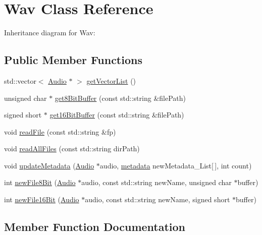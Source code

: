 \hypertarget{classWav}{}\section{Wav Class Reference}
\label{classWav}


Inheritance diagram for Wav\+:
\subsection*{Public Member Functions}
\begin{DoxyCompactItemize}
\item 
std\+::vector$<$ \hyperlink{classAudio}{Audio} $\ast$ $>$ \hyperlink{classWav_a68f79590f248a0db8f191f9e8d2d6672}{get\+Vector\+List} ()
\item 
unsigned char $\ast$ \hyperlink{classWav_a071344357789033b5afffbbbfbb5581b}{get8\+Bit\+Buffer} (const std\+::string \&file\+Path)
\item 
signed short $\ast$ \hyperlink{classWav_af1315b1ca824a7eadc2e85791004f884}{get16\+Bit\+Buffer} (const std\+::string \&file\+Path)
\item 
void \hyperlink{classWav_ae221a6a2d17ca08073ad82a017843e99}{read\+File} (const std\+::string \&fp)
\item 
void \hyperlink{classWav_a425a8f6fa3f47390617b272c353231ea}{read\+All\+Files} (const std\+::string dir\+Path)
\item 
void \hyperlink{classWav_a884d7be7c44a3f79dacf2a6f5b2e635f}{update\+Metadata} (\hyperlink{classAudio}{Audio} $\ast$audio, \hyperlink{structmetadata}{metadata} new\+Metadata\+\_\+\+List\mbox{[}$\,$\mbox{]}, int count)
\item 
int \hyperlink{classWav_a0df3872a0d777f8407de71ba71f756f4}{new\+File8\+Bit} (\hyperlink{classAudio}{Audio} $\ast$audio, const std\+::string new\+Name, unsigned char $\ast$buffer)
\item 
int \hyperlink{classWav_a4c3a3ebc811a2d4a4acd0fee974030d9}{new\+File16\+Bit} (\hyperlink{classAudio}{Audio} $\ast$audio, const std\+::string new\+Name, signed short $\ast$buffer)
\end{DoxyCompactItemize}


\subsection{Member Function Documentation}
\mbox{\label{classWav_af1315b1ca824a7eadc2e85791004f884}} 
